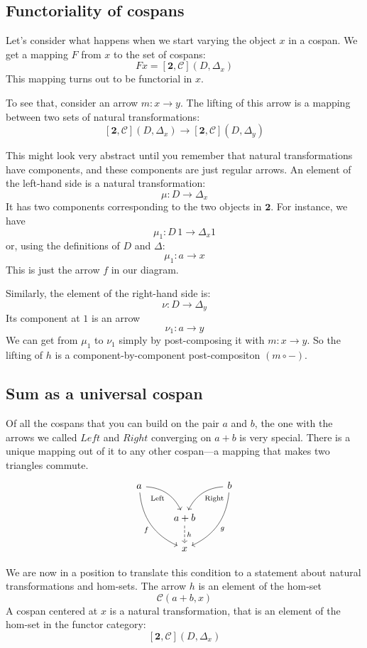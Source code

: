 \documentclass[DaoFP]{subfiles}
\begin{document}
\subsection{Functoriality of cospans}

Let's consider what happens when we start varying the object $x$ in a cospan. We get a mapping $F$ from $x$ to the set of cospans:
\[ F x = [\mathbf{2}, \mathcal{C}](D, \Delta_x) \]
This mapping turns out to be functorial in $x$.

To see that, consider an arrow $m \colon x \to y$. The lifting of this arrow is a mapping between two sets of natural transformations:
\[ [\mathbf{2}, \mathcal{C}](D, \Delta_x) \to [\mathbf{2}, \mathcal{C}](D, \Delta_{y}) \] 
 
This might look very abstract until you remember that natural transformations have components, and these components are just regular arrows. An element of the left-hand side is a natural transformation:
\[ \mu \colon D \to \Delta_x \]
It has two components corresponding to the two objects in $\mathbf{2}$. For instance, we have
\[ \mu_1 \colon D \, 1 \to \Delta_x 1 \]
or, using the definitions of $D$ and $\Delta$:
\[ \mu_1 \colon a \to x \]
This is just the arrow $f$ in our diagram. 

Similarly, the element of the right-hand side is:
\[ \nu \colon D \to \Delta_{y} \]
Its component at $1$ is an arrow
\[ \nu_1 \colon a \to y \]
We can get from $\mu_1$ to $\nu_1$ simply by post-composing it with $m \colon x \to y$. So the lifting of $h$ is a component-by-component post-compositon $(m \circ -)$. 

\subsection{Sum as a universal cospan}

Of all the cospans that you can build on the pair $a$ and $b$, the one with the arrows we called $Left$ and $Right$ converging on $a + b$  is very special. There is a unique mapping out of it to any other cospan---a mapping that makes two triangles commute.  
\[
 \begin{tikzcd}
 a
 \arrow[dr,  bend left, "\text{Left}"']
 \arrow[ddr, bend right, "f"']
 && b
 \arrow[dl, bend right, "\text{Right}"]
 \arrow[ddl, bend left, "g"]
 \\
&a + b
\arrow[d, dashed, "h"]
\\
& x
 \end{tikzcd}
\]

We are now in a position to translate this condition to a statement about natural transformations and hom-sets. The arrow $h$ is an element of the hom-set 
\[ \mathcal{C}(a + b, x)\]
A cospan centered at $x$ is a natural transformation, that is an element of the hom-set in the functor category:
\[ [\mathbf{2}, \mathcal{C}](D, \Delta_x) \]
\end{document}
